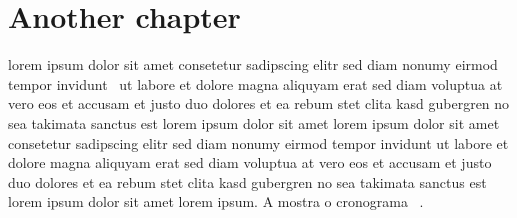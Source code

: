 \chapter{\label{chap:chap2}Another chapter}

lorem ipsum dolor sit amet consetetur sadipscing elitr sed diam
nonumy eirmod tempor invidunt~\cite{PLASSPAG81} ut labore et
dolore magna aliquyam erat sed diam voluptua at vero eos et
accusam et justo duo dolores et ea rebum stet clita kasd gubergren
no sea takimata sanctus est lorem ipsum dolor sit amet lorem ipsum
dolor sit amet consetetur sadipscing elitr sed diam nonumy eirmod
tempor invidunt ut labore et dolore magna aliquyam erat sed diam
voluptua at vero eos et accusam et justo duo dolores et ea rebum
stet clita kasd gubergren no sea takimata sanctus est lorem ipsum
dolor sit amet lorem ipsum. A  mostra o
cronograma ~\cite{WIKIPIC09}.

\begin{table}[htb]
\begin{center}
\caption{\label{tab:tab1}This is a table}%
\setlength{\tabcolsep}{.5cm}%
\end{center}
\end{table}

